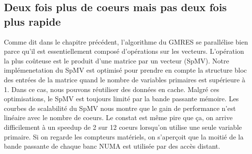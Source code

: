 \subsection{Deux fois plus de coeurs mais pas deux fois plus rapide}
Comme dit dans le chapitre précédent, l'algorithme du GMRES se parallélise bien parce qu'il est essentiellement composé d'opérations sur les vecteurs.
%
L'opération la plus coûteuse est le produit d'une matrice par un vecteur (SpMV).
%
Notre implémenetation du SpMV est optimisé pour prendre en compte la structure bloc des entrées de la matrice quand le nombre de variables primaires est supérieure à 1.
%
Dans ce cas, nous pouvons réutiliser des données en cache.
%
Malgré ces optimisations, le SpMV est toujours limité par la bande passante mémoire.
%
Les courbes de scalabilité du SpMV nous montre que le gain de performance n'est linéaire avec le nombre de coeurs.
%
Le constat est même pire que ça, on arrive difficilement à un speedup de 2 sur 12 coeurs lorsqu'on utilise une seule variable primaire.
%
Si on regarde les compteurs matériels, on s'aperçoit que la moitié de la bande passante de chaque banc NUMA est utilisée par des accès distant.
